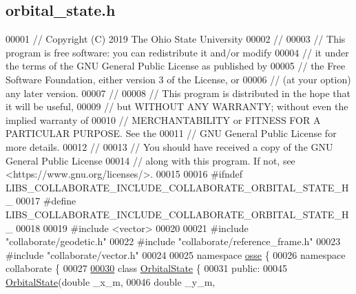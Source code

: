 \hypertarget{orbital__state_8h_source}{}\subsection{orbital\+\_\+state.\+h}
\label{orbital__state_8h_source}

\begin{DoxyCode}
00001 \textcolor{comment}{// Copyright (C) 2019 The Ohio State University}
00002 \textcolor{comment}{//}
00003 \textcolor{comment}{// This program is free software: you can redistribute it and/or modify}
00004 \textcolor{comment}{// it under the terms of the GNU General Public License as published by}
00005 \textcolor{comment}{// the Free Software Foundation, either version 3 of the License, or}
00006 \textcolor{comment}{// (at your option) any later version.}
00007 \textcolor{comment}{//}
00008 \textcolor{comment}{// This program is distributed in the hope that it will be useful,}
00009 \textcolor{comment}{// but WITHOUT ANY WARRANTY; without even the implied warranty of}
00010 \textcolor{comment}{// MERCHANTABILITY or FITNESS FOR A PARTICULAR PURPOSE.  See the}
00011 \textcolor{comment}{// GNU General Public License for more details.}
00012 \textcolor{comment}{//}
00013 \textcolor{comment}{// You should have received a copy of the GNU General Public License}
00014 \textcolor{comment}{// along with this program.  If not, see <https://www.gnu.org/licenses/>.}
00015 
00016 \textcolor{preprocessor}{#ifndef LIBS\_COLLABORATE\_INCLUDE\_COLLABORATE\_ORBITAL\_STATE\_H\_}
00017 \textcolor{preprocessor}{#define LIBS\_COLLABORATE\_INCLUDE\_COLLABORATE\_ORBITAL\_STATE\_H\_}
00018 
00019 \textcolor{preprocessor}{#include <vector>}
00020 
00021 \textcolor{preprocessor}{#include "collaborate/geodetic.h"}
00022 \textcolor{preprocessor}{#include "collaborate/reference\_frame.h"}
00023 \textcolor{preprocessor}{#include "collaborate/vector.h"}
00024 
00025 \textcolor{keyword}{namespace }\hyperlink{namespaceosse}{osse} \{
00026 \textcolor{keyword}{namespace }collaborate \{
00027 
\hyperlink{classosse_1_1collaborate_1_1_orbital_state}{00030} \textcolor{keyword}{class }\hyperlink{classosse_1_1collaborate_1_1_orbital_state}{OrbitalState} \{
00031  \textcolor{keyword}{public}:
00045   \hyperlink{classosse_1_1collaborate_1_1_orbital_state_a9990f1fc348981b44c1a9c7781cb9b4f}{OrbitalState}(\textcolor{keywordtype}{double} \_x\_m,
00046                \textcolor{keywordtype}{double} \_y\_m,

\end{DoxyCode}
